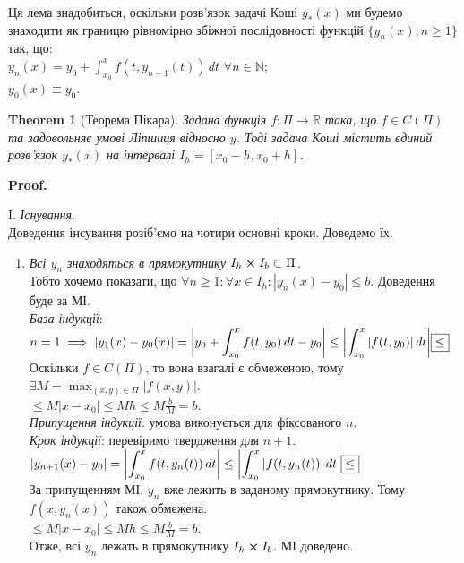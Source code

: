 \documentclass[a4paper, 10pt]{article}
\makeatletter
\def\qed{$\blacksquare$}
\theoremstyle{theoremdd}
\newtheorem{theorem}{Theorem}[subsection]
\theoremstyle{theoremdd}
\theoremstyle{theoremdd}
\theoremstyle{theoremdd}
\theoremstyle{theoremdd}
\theoremstyle{theoremdd}
\theoremstyle{theoremdd}
\theoremstyle{theoremdd}
\renewenvironment{proof}[1][Proof.\\]{\par
\pushQED{\hfill \qed}%
\normalfont \topsep6\p@\@plus6\p@\relax
\trivlist
\item\relax
{\bfseries
#1\@addpunct{.}}\hspace\labelsep\ignorespaces
}{%
\popQED\endtrivlist\@endpefalse
}
\makeatother
\begin{document}
	Ця лема знадобиться, оскільки розв'язок задачі Коші $y_*(x)$ ми будемо знаходити як границю рівномірно збіжної послідовності функцій $\{y_n(x), n \geq 1\}$ так, що:\\
	$\displaystyle y_n(x) = y_0 + \int_{x_0}^x f(t,y_{n-1}(t))\,dt$  $\forall n \in \mathbb{N}$;\\
	$y_0(x) \equiv y_0$.
	
	\begin{theorem}[Теорема Пікара]
	Задана функція $f\colon \Pi \to \mathbb{R}$ така, що $f \in C(\Pi)$ та задовольняє умові Ліпшиця відносно $y$. Тоді задача Коші містить єдиний розв'язок $y_*(x)$ на інтервалі $I_h = [x_0 - h, x_0 + h]$.
	\end{theorem}
	
	\begin{proof}
	I. \textit{Існування}.\\
	Доведення інсування розіб'ємо на чотири основні кроки. Доведемо їх.
	\begin{enumerate}[wide=0pt,label={\arabic*)}]
	\item \textit{Всі $y_n$ знаходяться в прямокутнику $I_h \cross I_b \subset \Pi$.} \\
	Тобто хочемо показати, що $\forall n \geq 1: \forall x \in I_h: |y_n(x)-y_0| \leq b$. Доведення буде за МІ.\\
	\textit{База індукції}: $n = 1 \implies \displaystyle |y_1(x) - y_0(x)| = \abs{y_0 + \int_{x_0}^x f(t,y_0)\,dt - y_0} \leq \abs{\int_{x_0}^x |f(t,y_0)|\,dt} \boxed{\leq}$\\
	Оскільки $f \in C(\Pi)$, то вона взагалі є обмеженою, тому $\exists M = \displaystyle \max_{(x,y)\in \Pi} |f(x,y)|$.\\
	$\displaystyle \boxed{\leq} M |x-x_0| \leq Mh \leq M \frac{b}{M}=b$.\\
	\textit{Припущення індукції}: умова виконується для фіксованого $n$.\\
	\textit{Крок індукції}: перевіримо твердження для $n+1$.\\
	$\displaystyle |y_{n+1}(x)-y_0| = \abs{\int_{x_0}^x f(t,y_n(t))\,dt} \leq \abs{\int_{x_0}^x |f(t,y_{n}(t))|\,dt} \boxed{\leq}$\\
	За припущенням МІ, $y_n$ вже лежить в заданому прямокутнику. Тому $f(x,y_n(x))$ також обмежена.\\
	$\displaystyle \boxed{\leq} M|x-x_0| \leq Mh \leq M\frac{b}{M}= b$.\\
	Отже, всі $y_n$ лежать в прямокутнику $I_h \cross I_b$. МІ доведено.
	

\end{enumerate}
\end{proof}
\end{document}
